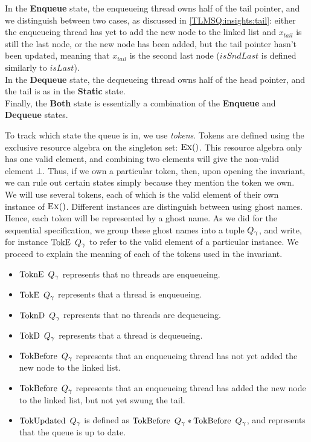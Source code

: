 \documentclass[twoside,11pt,openright]{report}
\newcommand{\StaticState}{\textbf{Static}}
\newcommand{\EnqueueState}{\textbf{Enqueue}}
\newcommand{\DequeueState}{\textbf{Dequeue}}
\newcommand{\BothState}{\textbf{Both}}
\newcommand{\Qg}{Q_\gname}
\newcommand{\TokE}[1]{\operatorname{TokE}\ #1}
\newcommand{\TokEQg}{\TokE{\Qg}}
\newcommand{\ToknE}[1]{\operatorname{ToknE}\ #1}
\newcommand{\ToknEQg}{\ToknE{\Qg}}
\newcommand{\TokD}[1]{\operatorname{TokD}\ #1}
\newcommand{\TokDQg}{\TokD{\Qg}}
\newcommand{\ToknD}[1]{\operatorname{ToknD}\ #1}
\newcommand{\ToknDQg}{\ToknD{\Qg}}
\newcommand{\TokBefore}[1]{\operatorname{TokBefore}\ #1}
\newcommand{\TokBeforeQg}{\TokBefore{\Qg}}
\newcommand{\TokAfterQg}{\TokBefore{\Qg}}
\newcommand{\TokUpdated}[1]{\operatorname{TokUpdated}\ #1}
\newcommand{\TokUpdatedQg}{\TokUpdated{\Qg}}
\begin{document}
In the \EnqueueState{} state, the enqueueing thread owns half of the tail pointer, and we distinguish between two cases, as discussed in \ref{TLMSQ:insights:tail}: either the enqueueing thread has yet to add the new node to the linked list and $x_{tail}$ is still the last node, or the new node has been added, but the tail pointer hasn't been updated, meaning that $x_{tail}$ is the second last node ($isSndLast$ is defined similarly to $isLast$).\\
In the \DequeueState{} state, the dequeueing thread owns half of the head pointer, and the tail is as in the \StaticState{} state.\\
Finally, the \BothState{} state is essentially a combination of the \EnqueueState{} and \DequeueState{} states.

To track which state the queue is in, we use \textit{tokens}. Tokens are defined using the exclusive resource algebra on the singleton set: $\textsc{Ex}{()}$. This resource algebra only has one valid element, and combining two elements will give the non-valid element $\bot$. Thus, if we own a particular token, then, upon opening the invariant, we can rule out certain states simply because they mention the token we own.\\
We will use several tokens, each of which is the valid element of their own instance of $\textsc{Ex}{()}$. Different instances are distinguish between using ghost names. Hence, each token will be represented by a ghost name. As we did for the sequential specification, we group these ghost names into a tuple $\Qg$, and write, for instance $\TokEQg$ to refer to the valid element of a particular instance. We proceed to explain the meaning of each of the tokens used in the invariant.
\begin{itemize}
  \item $\ToknEQg$ represents that no threads are enqueueing.
  \item $\TokEQg$ represents that a thread is enqueueing.
  \item $\ToknDQg$ represents that no threads are dequeueing.
  \item $\TokDQg$ represents that a thread is dequeueing.
  \item $\TokBeforeQg$ represents that an enqueueing thread has not yet added the new node to the linked list.
  \item $\TokAfterQg$ represents that an enqueueing thread has added the new node to the linked list, but not yet swung the tail.
  \item $\TokUpdatedQg$ is defined as $\TokBeforeQg \star \TokAfterQg$, and represents that the queue is up to date.
\end{itemize}
\end{document}
